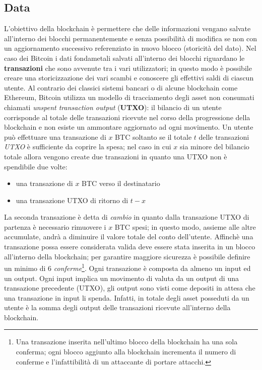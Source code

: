 \begin{enumerate}[1.]
\subsection{Data}
L'obiettivo della blockchain è permettere che delle informazioni vengano salvate all'interno dei blocchi permanentemente e senza possibilità di modifica se non con un aggiornamento successivo referenziato in nuovo blocco (storicità del dato).\newline
Nel caso dei Bitcoin i dati fondametali salvati all'interno dei blocchi riguardano le \textbf{transazioni} che sono avvenute tra i vari utilizzatori; in questo modo è possibile creare una storicizzazione dei vari scambi e conoscere gli effettivi saldi di ciascun utente.\newline
Al contrario dei classici sistemi bancari o di alcune blockchain come Ethereum, Bitcoin utilizza un modello di tracciamento degli asset non consumati chiamati \textit{unspent transaction output} (\textbf{UTXO}): il bilancio di un utente corrisponde al totale delle transazioni ricevute nel corso della progressione della blockchain e non esiste un ammontare aggiornato ad ogni movimento.\newline
Un utente può effettuare una transazione di $x$ BTC soltanto se il totale $t$ delle transazioni \textit{UTXO} è sufficiente da coprire la spesa; nel caso in cui $x$ sia minore del bilancio totale allora vengono create due transazioni in quanto una UTXO non è spendibile due volte:
\begin{itemize}
    \item una transazione di $x$ BTC verso il destinatario
    \item una transazione UTXO di ritorno di $t-x$
\end{itemize}
La seconda transazione è detta di \textit{cambio} in quanto dalla transazione UTXO di partenza è necessario rimuovere i $x$ BTC spesi; in questo modo, assieme alle altre accumulate, andrà a diminuire il valore totale del conto dell'utente.\newline
Affinchè una transazione possa essere considerata valida deve essere stata inserita in un blocco all'interno della blockchain; per garantire maggiore sicurezza è possibile definire un minimo di 6 \textit{conferme}\footnote{Una transazione inserita nell'ultimo blocco della blockchain ha una sola conferma; ogni blocco aggiunto alla blockchain incrementa il numero di conferme e l'infattibilità di un attaccante di portare attacchi.}. Ogni transazione è composta da almeno un input ed un output. Ogni input implica un movimento di valuta da un output di una transazione precedente (UTXO), gli output sono visti come depositi in attesa che una transazione in input li spenda. Infatti, in totale degli asset posseduti da un utente è la somma degli output delle transazioni ricevute all'interno della blockchain.

\end{enumerate}
